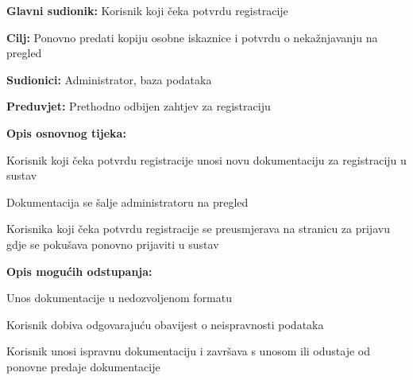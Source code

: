 						\begin{packed_item}
							
							\item \textbf{Glavni sudionik: }Korisnik koji čeka potvrdu registracije
							\item  \textbf{Cilj:} Ponovno predati kopiju osobne iskaznice i potvrdu o nekažnjavanju na pregled
							\item  \textbf{Sudionici:} Administrator, baza podataka
							\item  \textbf{Preduvjet:} Prethodno odbijen zahtjev za registraciju
							\item  \textbf{Opis osnovnog tijeka:}
							
							\item[] \begin{packed_enum}
								
								\item Korisnik koji čeka potvrdu registracije unosi novu dokumentaciju za registraciju u sustav 
								\item Dokumentacija se šalje administratoru na pregled 
								\item Korisnika koji čeka potvrdu registracije se preusmjerava na stranicu za prijavu gdje se pokušava ponovno prijaviti u sustav 
								
								
							\end{packed_enum}
							
							\item  \textbf{Opis mogućih odstupanja:}
							
							\item[] \begin{packed_item}
								
								\item[1.a] Unos dokumentacije u nedozvoljenom formatu 
								\item[] \begin{packed_enum}
									
									\item Korisnik dobiva odgovarajuću obavijest o neispravnosti podataka  
									\item Korisnik unosi ispravnu dokumentaciju i završava s unosom ili odustaje od ponovne predaje dokumentacije  
									
								\end{packed_enum}
								
								
							\end{packed_item}
						\end{packed_item}
